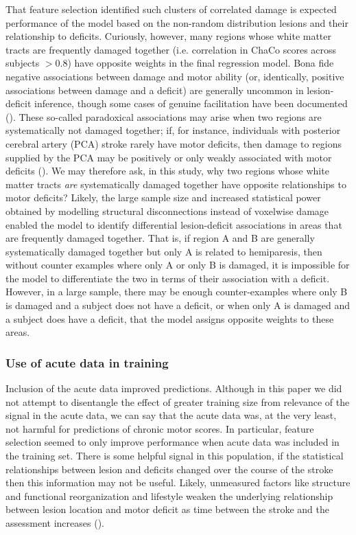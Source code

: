 \documentclass[phd,tocprelim]{cornell}
\begin{document}
That feature selection identified such clusters of correlated damage is expected performance of the model based on the non-random distribution lesions and their relationship to deficits. Curiously, however, many regions whose white matter tracts are frequently damaged together (i.e. correlation in ChaCo scores across subjects $>$0.8) have opposite weights in the final regression model. Bona fide negative associations between damage and motor ability (or, identically, positive associations between damage and a deficit) are generally uncommon in lesion-deficit inference, though some cases of genuine facilitation have been documented (\cite{Kapur1996-xq, Sperber2020-kp}). These so-called paradoxical associations may arise when two regions are systematically not damaged together; if, for instance, individuals with posterior cerebral artery (PCA) stroke rarely have motor deficits, then damage to regions supplied by the PCA may be positively or only weakly associated with motor deficits (\cite{Sperber2020-kp}). We may therefore ask, in this study, why two regions whose white matter tracts \textit{are} systematically damaged together have opposite relationships to motor deficits? Likely, the large sample size and increased statistical power obtained by modelling structural disconnections instead of voxelwise damage enabled the model to identify differential lesion-deficit associations in areas that are frequently damaged together. That is, if region A and B are generally systematically damaged together but only A is related to hemiparesis, then without counter examples where only A or only B is damaged, it is impossible for the model to differentiate the two in terms of their association with a deficit. However, in a large sample, there may be enough counter-examples where only B is damaged and a subject does not have a deficit, or when only A is damaged and a subject does have a deficit, that the model assigns opposite weights to these areas. 


\subsubsection{Use of acute data in training}
Inclusion of the acute data improved predictions. Although in this paper we did not attempt to disentangle the effect of greater training size from relevance of the signal in the acute data, we can say that the acute data was, at the very least, not harmful for predictions of chronic motor scores. In particular, feature selection seemed to only improve performance when acute data was included in the training set. There is some helpful signal in this population, if the statistical relationships between lesion and deficits changed over the course of the stroke then this information may not be useful. Likely, unmeasured factors like structure and functional reorganization and lifestyle weaken the underlying relationship between lesion location and motor deficit as time between the stroke and the assessment increases (\cite{Shahid2017-gx}). 
\end{document}
